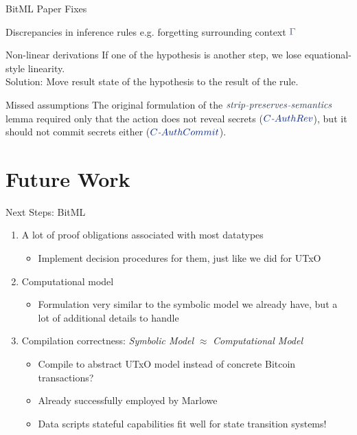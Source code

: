 \documentclass[aspectratio=43]{beamer}
\renewcommand\alert[1]{\textcolor{mLightBrown}{#1}}
\newcommand*{\mathcolor}{}
\def\mathcolor#1#{\mathcoloraux{#1}}
\newcommand*{\mathcoloraux}[3]{%
  \protect\leavevmode
  \begingroup
    \color#1{#2}#3%
  \endgroup
}
\newcommand{\HSSym}[1]{\mathcolor{hsblue4}{\ensuremath{#1}}}
\newcommand{\HSCon}[1]{\mathcolor{hsblue3}{#1}}
\newcommand{\HSVar}[1]{\mathcolor{hsblue5}{\mathit{\ensuremath{#1}}}}
\begin{document}
\begin{frame}{BitML Paper Fixes}

\begin{alertblock}{Discrepancies in inference rules}
e.g. forgetting surrounding context \ensuremath{\HSSym{\Gamma}}
\end{alertblock}
\vfill
\begin{alertblock}{Non-linear derivations}
If one of the hypothesis is another step, we lose equational-style linearity. \\
\alert{Solution:} Move result state of the hypothesis to the result of the rule.
\end{alertblock}
\vfill
\begin{alertblock}{Missed assumptions}
The original formulation of the \ensuremath{\HSVar{strip}\HSSym{\text{\textit{-}}}\HSVar{preserves}\HSSym{\text{\textit{-}}}\HSVar{semantics}} lemma required only that the action does not reveal secrets (\ensuremath{\HSCon{C}\HSSym{\text{\textit{-}}}\HSCon{AuthRev}}), but it should not commit secrets either (\ensuremath{\HSCon{C}\HSSym{\text{\textit{-}}}\HSCon{AuthCommit}}).
\end{alertblock}

\end{frame}
\section{Future Work}

\begin{frame}{Next Steps: BitML}
\begin{enumerate}
\item A lot of proof obligations associated with most datatypes
  \begin{itemize}
  \item Implement \alert{decision procedures} for them, just like we did for UTxO
  \end{itemize}
\item Computational model
  \begin{itemize}
  \item Formulation very similar to the symbolic model we already have,
     but a lot of additional details to handle
  \end{itemize}
\item Compilation correctness: \textit{Symbolic Model} $\approx$ \textit{Computational Model}
  \begin{itemize}
  \item Compile to \alert{abstract UTxO model} instead of concrete Bitcoin transactions?
  \item Already successfully employed by \alert{Marlowe}
  \item \alert{Data scripts} stateful capabilities fit well for state transition systems!
  \end{itemize}
\end{enumerate}
\end{frame}
\end{document}
